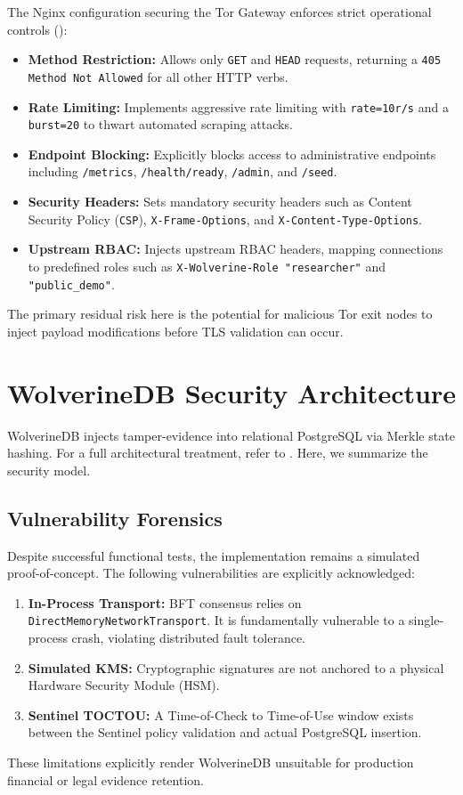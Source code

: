 The Nginx configuration securing the Tor Gateway enforces strict operational controls ():
\begin{itemize}
    \item \textbf{Method Restriction:} Allows only \texttt{GET} and \texttt{HEAD} requests, returning a 
          \texttt{405 Method Not Allowed} for all other HTTP verbs.
    \item \textbf{Rate Limiting:} Implements aggressive rate limiting with \texttt{rate=10r/s} and a \texttt{burst=20} 
          to thwart automated scraping attacks.
    \item \textbf{Endpoint Blocking:} Explicitly blocks access to administrative endpoints including \texttt{/metrics}, 
          \texttt{/health/ready}, \texttt{/admin}, and \texttt{/seed}.
    \item \textbf{Security Headers:} Sets mandatory security headers such as Content Security Policy (\texttt{CSP}), 
          \texttt{X-Frame-Options}, and \texttt{X-Content-Type-Options}.
    \item \textbf{Upstream RBAC:} Injects upstream RBAC headers, mapping connections to predefined roles such as 
          \texttt{X-Wolverine-Role "researcher"} and \texttt{"public\_demo"}.
\end{itemize}
The primary residual risk here is the potential for malicious Tor exit nodes to inject payload modifications before 
TLS validation can occur.

\section{WolverineDB Security Architecture}
\label{sec:sec-wolverinedb}
WolverineDB injects tamper-evidence into relational PostgreSQL via Merkle state hashing. For a full architectural 
treatment, refer to . Here, we summarize the security model.

\subsection{Vulnerability Forensics}
\label{subsec:vuln-forensics}
Despite successful functional tests, the implementation remains a simulated proof-of-concept. The following 
vulnerabilities are explicitly acknowledged:
\begin{enumerate}
    \item \textbf{In-Process Transport:} BFT consensus relies on \texttt{DirectMemoryNetworkTransport}. It is 
          fundamentally vulnerable to a single-process crash, violating distributed fault tolerance.
    \item \textbf{Simulated KMS:} Cryptographic signatures are not anchored to a physical Hardware Security Module 
          (HSM).
    \item \textbf{Sentinel TOCTOU:} A Time-of-Check to Time-of-Use window exists between the Sentinel policy validation 
          and actual PostgreSQL insertion.
\end{enumerate}
These limitations explicitly render WolverineDB unsuitable for production financial or legal evidence retention.

